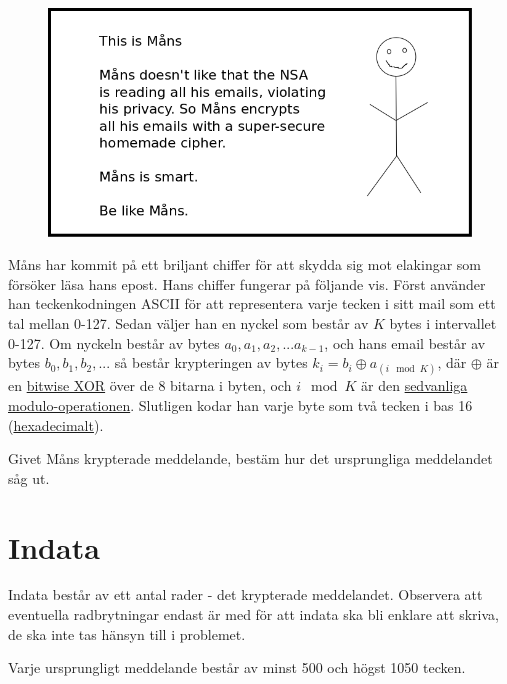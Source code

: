 
\begin{center}
  \begin{figure}[h!]
    \includegraphics[width=\textwidth]{mans.png}
  \end{figure}
\end{center}

Måns har kommit på ett briljant chiffer för att skydda sig mot elakingar som försöker läsa hans epost. Hans chiffer fungerar på följande vis. Först använder han teckenkodningen ASCII för att representera varje tecken i sitt mail som ett tal mellan 0-127. Sedan väljer han en nyckel som består av $K$ bytes i intervallet 0-127. Om nyckeln består av bytes $a_0, a_1, a_2, ... a_{k - 1}$, och hans email består av bytes $b_0, b_1, b_2, ...$ så består krypteringen
av bytes $k_i = b_i \oplus a_{(i \mod K)}$, där $\oplus$ är en \href{https://en.wikipedia.org/wiki/Bitwise\_operation#XOR}{bitwise XOR} över de 8 bitarna i byten, och $i \mod K$ är den \href{https://en.wikipedia.org/wiki/Modulo\_operation}{sedvanliga modulo-operationen}. Slutligen kodar han varje byte som två tecken i bas 16 (\href{https://en.wikipedia.org/wiki/Hexadecimal}{hexadecimalt}).

Givet Måns krypterade meddelande, bestäm hur det ursprungliga meddelandet såg ut.

\section*{Indata}
Indata består av ett antal rader - det krypterade meddelandet. Observera att eventuella radbrytningar endast är med för att indata ska bli enklare att skriva, de ska inte tas hänsyn till i problemet.

Varje ursprungligt meddelande består av minst 500 och högst 1050 tecken.

